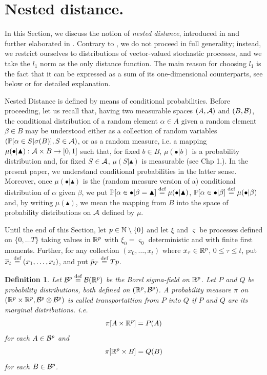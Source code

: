 \documentclass{article}              %
\newtheorem{definition}{Definition}
\begin{document}
\section{\label{sec:Nested}Nested distance.}

In this Section, we discuss the notion of {\em nested distance}, introduced
in \cite{pflug2012distance} and further elaborated in \cite{pflug2014multistage}.
Contrary to \cite{pflug2014multistage}, we do not proceed in full
generality; instead, we restrict ourselves to distributions of vector-valued
stochastic processes, and we take the $l_{1}$ norm as the only distance
function. The main reason for choosing $l_{1}$ is the fact that it can be expressed as a sum of its one-dimensional counterparts, see below or \cite{Smid09c} for detailed explanation.

Nested Distance is defined by means of conditional probabilities.
Before proceeding, let us recall that, having two measurable spaces $(A,\mathcal{A})$ and $(B,\mathcal{B})$, the conditional distribution of
a random element $\alpha\in A$ given a random element $\beta\in B$
may be understood either as a collection of random variables $(\mathbb{P}[\alpha\in S|\sigma(B)],S \in \mathcal{A})$, or as a random measure, i.e. a mapping $\mu(\bullet|\blacktriangle):\mathcal{A}\times B\rightarrow[0,1]$
such that, for fixed $b\in B$, $\mu(\bullet|b)$ is a probability
distribution and, for fixed $S\in\mathcal{A}$, $\mu(S|\blacktriangle)$ is
measurable (see \cite{Kallenberg02} Chp 1.). In the present paper,
we understand conditional probabilities in the latter sense. Moreover, once
$\mu(\bullet|\blacktriangle)$ is the (random measure version of a) conditional
distribution of $\alpha$ given $\beta$, we put $\mathbb{P}[\alpha\in\bullet|\beta=\blacktriangle]\stackrel{\text{\rm def}}{=}\mu(\bullet|\blacktriangle)$,
$\mathbb{P}[\alpha\in\bullet|\beta]\stackrel{\text{\rm def}}{=}\mu(\bullet|\beta)$ and, by writing
$\mu(\blacktriangle)$, we mean the mapping from $B$ into the
space of probability distributions on $\mathcal{A}$ defined by $\mu$.

Until the end of this Section, let $p\in\mathbb{N} \setminus \{0\}$ and let $\xi$ and $\varsigma$
be processes defined on $\{0,\dots T\}$ taking values in $\mathbb{R}^{p}$
with $\xi_{0}=\varsigma_{0}$ deterministic and with finite first
moments. Further, 
for any collection $(x_{0},\dots,x_{t})$ where $x_\tau \in \mathbb{R}^p$, $0\leq \tau \leq t$, put $\overline{x}_{t}\stackrel{\text{\rm def}}{=}(x_{1},\dots,x_{t})$, and put $\bar{p}_{T}\stackrel{\text{\rm def}}{=} Tp$.

\begin{definition} Let $\mathcal{B}^{p}\stackrel{\text{\rm def}}{=}\mathcal{B}(\mathbb{R}^{p})$ be the Borel
sigma-field on $\mathbb{R}^{p}$.
Let $P$ and $Q$ be probability distributions, both defined on $(\mathbb{R}^{p},\mathcal{B}^{p})$. A probability measure $\pi$ on $(\mathbb{R}^{p}\times\mathbb{R}^{p},\mathcal{B}^{p}\otimes\mathcal{B}^{p})$
is called \emph{transportattion} from $P$ into $Q$ if $P$ and
$Q$ are its marginal distributions. i.e.
\begin{equation}
\pi[A\times\mathbb{R}^{p}]=P(A)\label{eq:tpp}
\end{equation}
for each $A\in\mathcal{B}^{p}$ and 
\begin{equation}
\pi[\mathbb{R}^{p}\times B]=Q(B)\label{eq:tpq}
\end{equation}
for each $B\in\mathcal{B}^{p}$. 
\end{definition}
\end{document}
